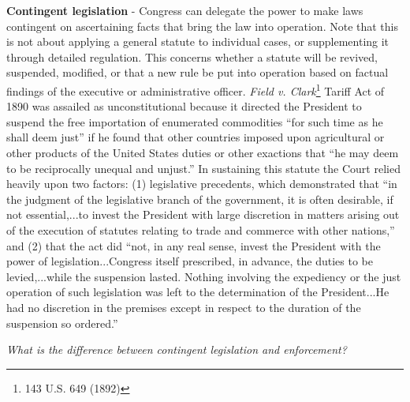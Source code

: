 \documentclass[../main.tex]{subfiles}
\begin{document}
\textbf{Contingent legislation} - Congress can delegate the power to make laws contingent on ascertaining facts that bring the law into operation. Note that this is not about applying a general statute to individual cases, or supplementing it through detailed regulation. This concerns whether a statute will be revived, suspended, modified, or that a new rule be put into operation based on factual findings of the executive or administrative officer. \textit{Field v. Clark}\footnote{143 U.S. 649 (1892)} Tariff Act of 1890 was assailed as unconstitutional because it directed the President to suspend the free importation of enumerated commodities “for such time as he shall deem just” if he found that other countries imposed upon agricultural or other products of the United States duties or other exactions that “he may deem to be reciprocally unequal and unjust.” In sustaining this statute the Court relied heavily upon two factors: (1) legislative precedents, which demonstrated that “in the judgment of the legislative branch of the government, it is often desirable, if not essential,...to invest the President with large discretion in matters arising out of the execution of statutes relating to trade and commerce with other nations,” and (2) that the act did “not, in any real sense, invest the President with the power of legislation...Congress itself prescribed, in advance, the duties to be levied,...while the suspension lasted. Nothing involving the expediency or the just operation of such legislation was left to the determination of the President...He had no discretion in the premises except in respect to the duration of the suspension so ordered.”


\textit{What is the difference between contingent legislation and enforcement?}
\end{document}

